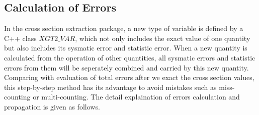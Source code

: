 \documentclass[a4paper,10.5pt]{report}
\begin{document}
\subsection{Calculation of Errors}
 In the cross section extraction package, a new type of variable is defined by a C++ class $XGT2\_VAR$, which not only includes the exact value of one quantity but also includes its sysmatic error and statistic error. When a new quantity is calculated from the operation of other quantities, all sysmatic errors and statistic errors from them will be seperately combined and carried by this new quantity. Comparing with evaluation of total errors after we exact the cross section values, this step-by-step method has its advantage to avoid mistakes such as miss-counting or multi-counting. The detail explaination of errors calculation and propagation is given as follows.
\end{document}

